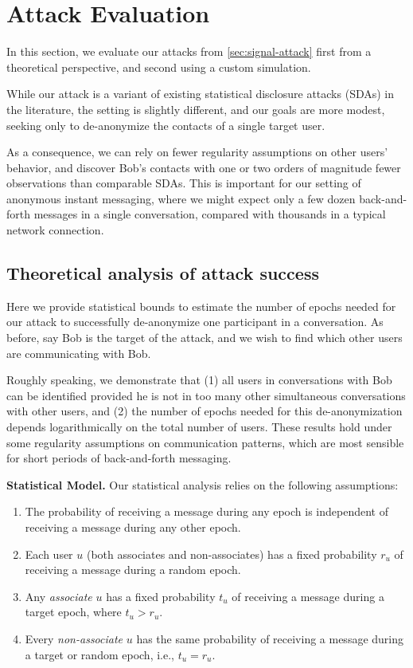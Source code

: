 \section{Attack Evaluation}\label{sec:signal-attack-eval}
In this section, we evaluate our attacks from \cref{sec:signal-attack}
first from a theoretical perspective, and second using a custom simulation.

While our attack is a variant of existing statistical disclosure attacks
(SDAs) in the literature,
the setting is slightly different, and our goals are more modest,
seeking only to de-anonymize the contacts of a single target user. 

As a
consequence, we can rely on fewer regularity assumptions on other users'
behavior, and discover Bob's contacts with one or two orders of
magnitude fewer observations than comparable SDAs.
This is important for
our setting of anonymous instant messaging, where we might expect only
a few dozen back-and-forth messages in a single conversation, compared
with thousands in a typical network connection.
\fi
\combinedfigures


\subsection{Theoretical analysis of attack success}
\label{sec:signal-attacktheory}

Here we provide statistical bounds to estimate the number of epochs
needed for our attack to successfully de-anonymize one participant in a
conversation. As before, say Bob is the target of the attack, and we
wish to find which other users are communicating with Bob.

Roughly speaking, we demonstrate that (1) all users in conversations with Bob
can be identified provided he is not in too many other simultaneous
conversations with other users, and (2) the number of epochs needed for
this de-anonymization depends logarithmically on the total number of
users. These results hold under some regularity assumptions on
communication patterns, which are most sensible for short periods of
back-and-forth messaging.

\medskip \noindent
\textbf{Statistical Model.} Our statistical analysis relies on the following assumptions:
\begin{enumerate}[nosep]
  \item The probability of receiving a message during any epoch is
    independent of receiving a message during any other epoch.
  \item Each user $u$ (both associates and non-associates) has a fixed
    probability $r_u$ of receiving a message during a random epoch.
  \item Any \emph{associate} $u$ has a fixed probability $t_u$ of
    receiving a message during a target epoch, where $t_u > r_u$.
  \item Every \emph{non-associate} $u$ has the same probability of
    receiving a message during a target or random epoch, i.e., $t_u = r_u$.
\end{enumerate}

